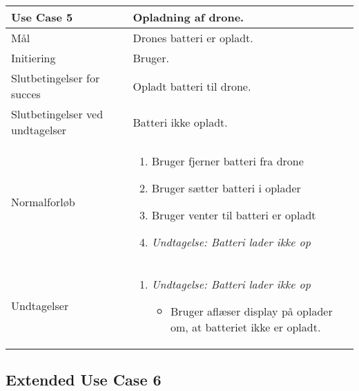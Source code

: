 \documentclass[Main]{subfiles}
\begin{document}
\begin{longtable}{|p{}|p{}|}
\hline
Use Case 5 	& 
Opladning af drone. \\ \hline

Mål 		& 
Drones batteri er opladt. \\ \hline

Initiering	& 
Bruger. \\ \hline

Slutbetingelser for succes & 
Opladt batteri til drone.  \\ \hline

Slutbetingelser ved undtagelser & 
Batteri ikke opladt. \\ \hline

Normalforløb &	\vspace{-8mm}
	\begin{enumerate}[noitemsep,nolistsep,leftmargin=*]
	\item Bruger fjerner batteri fra drone
	\item Bruger sætter batteri i oplader
	\item Bruger venter til batteri er opladt
	\item[]	\textit{Undtagelse: Batteri lader ikke op}
	\end{enumerate} \\ \hline

Undtagelser & \vspace{-8mm}
	\begin{enumerate}[noitemsep,nolistsep,leftmargin=*]
	\item[] \textit{Undtagelse: Batteri lader ikke op}
		\begin{itemize}[noitemsep,nolistsep]
		\item Bruger aflæser display på oplader om, at batteriet ikke er opladt.
		\end{itemize}
	\end{enumerate}\\
\hline
\end{longtable}



\subsection{Extended Use Case 6}\label{UC:extend}
\end{document}

